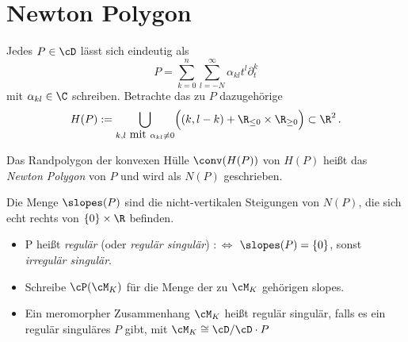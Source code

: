 \section{Newton Polygon} %
\begin{comment}
Quelle: sabba?\\
sabbah mach alles formal, barbara mach alles konvergent
\end{comment}
Jedes $P\in \cD$ lässt sich eindeutig als
\[ P=\sum^{n}_{k=0}{\sum^{\infty}_{l=-N}{\alpha_{kl}t^l\partial_t^k}} \]
mit $\alpha_{kl}\in\C$ schreiben. Betrachte das zu $P$ dazugehörige
\[ H(P):=\underset{k,l\mbox{ mit }\alpha_{kl}\neq0}{\bigcup}\Big( (k,l-k) +
\R_{\leq 0}\times \R_{\geq 0} \Big) \subset \R^2 \,. \]
\begin{comment}
Bei Sabbah: $H\subset \N\times\Z$ und dann konvexe Hülle davon in $\R^2$
\end{comment}

\begin{defn} %
Das Randpolygon der konvexen Hülle $\conv(H(P))$ von $H(P)$ heißt das
\emph{Newton Polygon} von $P$ und wird als $N(P)$ geschrieben.
\end{defn}

\begin{defn} %
Die Menge $\slopes(P)$ sind die nicht-vertikalen Steigungen von $N(P)$, die
sich echt rechts von $\{0\}\times\R$ befinden.\\ %
\begin{itemize}
\item P heißt \emph{regulär} (oder \emph{regulär singulär}) $:\Leftrightarrow$
$\slopes(P)=\{0\}$, sonst \emph{irregulär singulär}.
\item Schreibe $\cP(\cM_K)$ für die Menge der zu $\cM_K$ gehörigen slopes.
\item Ein meromorpher Zusammenhang $\cM_K$ heißt regulär singulär, falls es
ein regulär singuläres $P$ gibt, mit $\cM_K\cong\cD/\cD\cdot P$
\end{itemize}
\end{defn}

